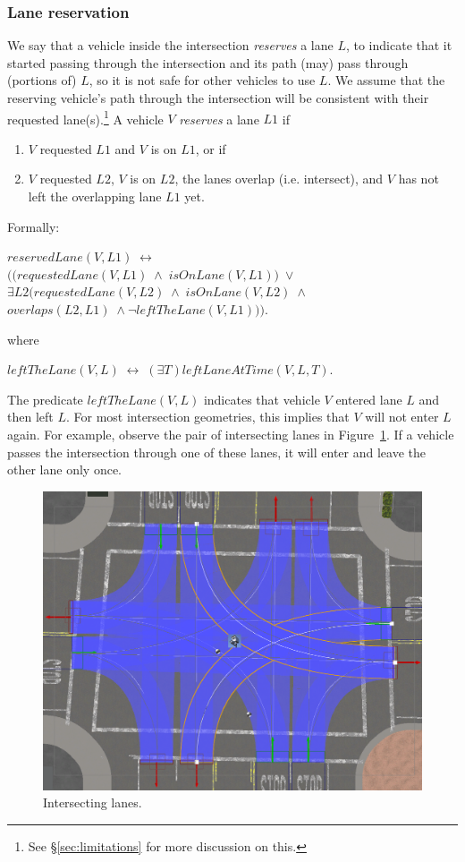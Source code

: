 \subsubsection{Lane reservation}
We say that
a vehicle inside the intersection \emph{reserves} a lane $L$,
to indicate that it started passing through the intersection
and its path (may) pass through (portions of) $L$,
so it is not safe for other vehicles to use $L$.
We assume that the reserving vehicle's path through the intersection
will be consistent with their requested lane(s).\footnote{\label{foot:limitations}See \S \ref{sec:limitations} for more discussion on this.}
A vehicle $V$ \emph{reserves} a lane $L1$ if
\begin{enumerate}
    \item 
    $V$ requested $L1$ and $V$ is on $L1$,
    or if
    \item
    $V$ requested $L2$,
    $V$ is on $L2$,
    the lanes overlap (i.e. intersect),
    and $V$ has not left the overlapping lane $L1$ yet.
\end{enumerate}
Formally:
\begin{center}
    $ reservedLane(V, L1) \; \leftrightarrow $ \\
    $ \Bigg(  \Big(  requestedLane(V, L1) \; \land \; isOnLane(V, L1) \Big) \; \lor $ \\
    $ \exists L2 \Big( requestedLane(V, L2) \; \land \; isOnLane(V, L2) \; \land$ \\
    $ overlaps(L2, L1) \; \land \neg leftTheLane(V, L1) \Big) \Bigg).$
\end{center}
where
\begin{center}
    $ leftTheLane(V, L) \; \leftrightarrow \; (\exists T) leftLaneAtTime(V, L, T) $.
\end{center}
The predicate $leftTheLane(V, L)$ indicates that
vehicle $V$ entered lane $L$ and then left $L$.
For most intersection geometries,
this implies that $V$ will not enter $L$ again.
For example,
observe the pair of intersecting lanes in Figure~\ref{fig:lane-intersection}.
If a vehicle passes the intersection through one of these lanes,
it will enter and leave the other lane only once.\footnotemark[\ref{foot:limitations}]
\begin{figure}
\centering
\includegraphics[width=0.5\linewidth]{figures/chapter3/lane_intersection.png}
\caption{Intersecting lanes.}
\label{fig:lane-intersection}
\vspace{-0.5cm}
\end{figure}
